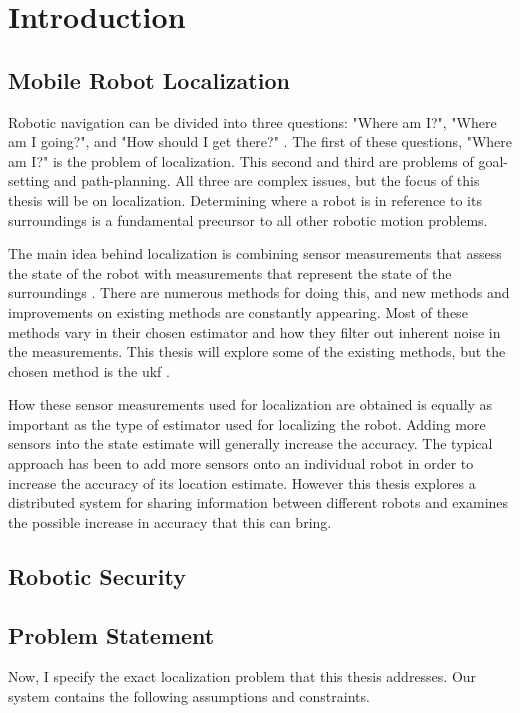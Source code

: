 \documentclass[thesis.tex]{subfile}
\begin{document}
\chapter{Introduction}
\section{Mobile Robot Localization}
Robotic navigation can be divided into three questions: "Where am I?", "Where am I going?", and "How should I get there?" \cite{Leonard1991}. The first of these questions, "Where am I?" is the problem of localization. This second and third are problems of goal-setting and path-planning. All three are complex issues, but the focus of this thesis will be on localization. Determining where a robot is in reference to its surroundings is a fundamental precursor to all other robotic motion problems.

The main idea behind localization is combining sensor measurements that assess the state of the robot with measurements that represent the state of the surroundings \cite{Roumeliotis2002}. There are numerous methods for doing this, and new methods and improvements on existing methods are constantly appearing. Most of these methods vary in their chosen estimator and how they filter out inherent noise in the measurements. This thesis will explore some of the existing methods, but the chosen method is the \gls{ukf} \cite{Julier1997}.

How these sensor measurements used for localization are obtained is equally as important as the type of estimator used for localizing the robot. Adding more sensors into the state estimate will generally increase the accuracy. The typical approach has been to add more sensors onto an individual robot in order to increase the accuracy of its location estimate. However this thesis explores a distributed system for sharing information between different robots and examines the possible increase in accuracy that this can bring.

\section{Robotic Security}
   

\section{Problem Statement}
Now, I specify the exact localization problem that this thesis addresses. Our system contains the following assumptions and constraints.
\end{document}
